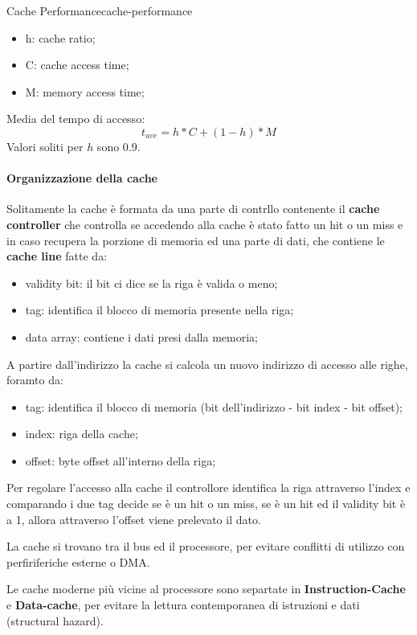 \documentclass[12pt]{article}
\begin{document}
\begin{theorem}{Cache Performance}{cache-performance}
    \begin{itemize}
        \item h: cache ratio;
        \item C: cache access time;
        \item M: memory access time;
    \end{itemize}
    Media del tempo di accesso:
    \[ t_{ave} = h * C + (1-h) * M \]
    Valori soliti per $h$ sono $0.9$.
\end{theorem}

\paragraph{Organizzazione della cache}
Solitamente la cache \`e formata da una parte di contrllo contenente il \textbf{cache controller} che controlla se accedendo alla cache \`e stato fatto un hit o un miss e in caso recupera la porzione di memoria ed una parte di dati, che contiene le \textbf{cache line} fatte da:
\begin{itemize}
    \item validity bit: il bit ci dice se la riga \`e valida o meno;
    \item tag: identifica il blocco di memoria presente nella riga;
    \item data array: contiene i dati presi dalla memoria;
\end{itemize}
A partire dall'indirizzo la cache si calcola un nuovo indirizzo di accesso alle righe, foramto da:
\begin{itemize}
    \item tag: identifica il blocco di memoria (bit dell'indirizzo - bit index - bit offset);
    \item index: riga della cache;
    \item offset: byte offset all'interno della riga;
\end{itemize}
Per regolare l'accesso alla cache il controllore identifica la riga attraverso l'index e comparando i due tag decide se \`e un hit o un miss, se \`e un hit ed il validity bit \`e a 1, allora attraverso l'offset viene prelevato il dato.

La cache si trovano tra il bus ed il processore, per evitare conflitti di utilizzo con perfiriferiche esterne o DMA.

Le cache moderne pi\`u vicine al processore sono separtate in \textbf{Instruction-Cache} e \textbf{Data-cache}, per evitare la lettura contemporanea di istruzioni e dati (structural hazard).
\end{document}
